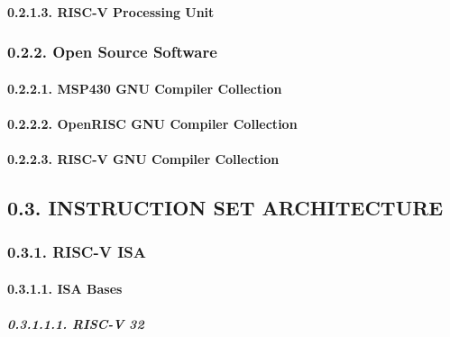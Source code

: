 \documentclass[
]{article}
\begin{document}
\hypertarget{risc-v-processing-unit}{%
\paragraph{0.2.1.3. RISC-V Processing
Unit}\label{risc-v-processing-unit}}

\hypertarget{open-source-software}{%
\subsubsection{0.2.2. Open Source Software}\label{open-source-software}}

\hypertarget{msp430-gnu-compiler-collection}{%
\paragraph{0.2.2.1. MSP430 GNU Compiler
Collection}\label{msp430-gnu-compiler-collection}}

\hypertarget{openrisc-gnu-compiler-collection}{%
\paragraph{0.2.2.2. OpenRISC GNU Compiler
Collection}\label{openrisc-gnu-compiler-collection}}

\hypertarget{risc-v-gnu-compiler-collection}{%
\paragraph{0.2.2.3. RISC-V GNU Compiler
Collection}\label{risc-v-gnu-compiler-collection}}

\hypertarget{instruction-set-architecture}{%
\subsection{0.3. INSTRUCTION SET
ARCHITECTURE}\label{instruction-set-architecture}}

\hypertarget{risc-v-isa}{%
\subsubsection{0.3.1. RISC-V ISA}\label{risc-v-isa}}

\hypertarget{isa-bases}{%
\paragraph{0.3.1.1. ISA Bases}\label{isa-bases}}

\hypertarget{risc-v-32}{%
\subparagraph{0.3.1.1.1. RISC-V 32}\label{risc-v-32}}
\end{document}
